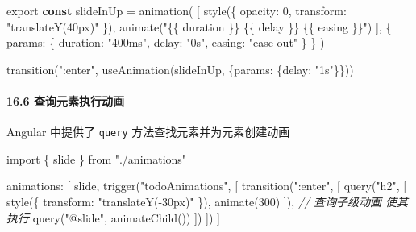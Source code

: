 \documentclass[
]{article}
\newenvironment{Shaded}{}{}
\newcommand{\CommentTok}[1]{\textcolor[rgb]{0.38,0.63,0.69}{\textit{#1}}}
\newcommand{\DataTypeTok}[1]{\textcolor[rgb]{0.56,0.13,0.00}{#1}}
\newcommand{\DecValTok}[1]{\textcolor[rgb]{0.25,0.63,0.44}{#1}}
\newcommand{\FunctionTok}[1]{\textcolor[rgb]{0.02,0.16,0.49}{#1}}
\newcommand{\ImportTok}[1]{#1}
\newcommand{\KeywordTok}[1]{\textcolor[rgb]{0.00,0.44,0.13}{\textbf{#1}}}
\newcommand{\NormalTok}[1]{#1}
\newcommand{\OperatorTok}[1]{\textcolor[rgb]{0.40,0.40,0.40}{#1}}
\newcommand{\StringTok}[1]{\textcolor[rgb]{0.25,0.44,0.63}{#1}}
\begin{document}
\begin{enumerate}
\begin{Shaded}
\begin{Highlighting}[]
\ImportTok{export} \KeywordTok{const}\NormalTok{ slideInUp }\OperatorTok{=} \FunctionTok{animation}\NormalTok{(}
\NormalTok{  [}
    \FunctionTok{style}\NormalTok{(\{ }\DataTypeTok{opacity}\OperatorTok{:} \DecValTok{0}\OperatorTok{,} \DataTypeTok{transform}\OperatorTok{:} \StringTok{"translateY(40px)"}\NormalTok{ \})}\OperatorTok{,}
    \FunctionTok{animate}\NormalTok{(}\StringTok{"\{\{ duration \}\} \{\{ delay \}\} \{\{ easing \}\}"}\NormalTok{)}
\NormalTok{  ]}\OperatorTok{,}
\NormalTok{  \{}
    \DataTypeTok{params}\OperatorTok{:}\NormalTok{ \{}
      \DataTypeTok{duration}\OperatorTok{:} \StringTok{"400ms"}\OperatorTok{,}
      \DataTypeTok{delay}\OperatorTok{:} \StringTok{"0s"}\OperatorTok{,}
      \DataTypeTok{easing}\OperatorTok{:} \StringTok{"ease{-}out"}
\NormalTok{    \}}
\NormalTok{  \}}
\NormalTok{)}
\end{Highlighting}
\end{Shaded}

\begin{Shaded}
\begin{Highlighting}[]
\FunctionTok{transition}\NormalTok{(}\StringTok{":enter"}\OperatorTok{,} \FunctionTok{useAnimation}\NormalTok{(slideInUp}\OperatorTok{,}\NormalTok{ \{}\DataTypeTok{params}\OperatorTok{:}\NormalTok{ \{}\DataTypeTok{delay}\OperatorTok{:} \StringTok{"1s"}\NormalTok{\}\}))}
\end{Highlighting}
\end{Shaded}
\end{enumerate}

\hypertarget{166-ux67e5ux8be2ux5143ux7d20ux6267ux884cux52a8ux753b}{%
\paragraph{16.6
查询元素执行动画}\label{166-ux67e5ux8be2ux5143ux7d20ux6267ux884cux52a8ux753b}}

Angular 中提供了 \texttt{query} 方法查找元素并为元素创建动画

\begin{Shaded}
\begin{Highlighting}[]
\ImportTok{import}\NormalTok{ \{ slide \} }\ImportTok{from} \StringTok{"./animations"}

\NormalTok{animations}\OperatorTok{:}\NormalTok{ [}
\NormalTok{  slide}\OperatorTok{,}
  \FunctionTok{trigger}\NormalTok{(}\StringTok{"todoAnimations"}\OperatorTok{,}\NormalTok{ [}
    \FunctionTok{transition}\NormalTok{(}\StringTok{":enter"}\OperatorTok{,}\NormalTok{ [}
      \FunctionTok{query}\NormalTok{(}\StringTok{"h2"}\OperatorTok{,}\NormalTok{ [}
        \FunctionTok{style}\NormalTok{(\{ }\DataTypeTok{transform}\OperatorTok{:} \StringTok{"translateY({-}30px)"}\NormalTok{ \})}\OperatorTok{,}
        \FunctionTok{animate}\NormalTok{(}\DecValTok{300}\NormalTok{)}
\NormalTok{      ])}\OperatorTok{,}
      \CommentTok{// 查询子级动画 使其执行}
      \FunctionTok{query}\NormalTok{(}\StringTok{"@slide"}\OperatorTok{,} \FunctionTok{animateChild}\NormalTok{())}
\NormalTok{    ])}
\NormalTok{  ])}
\NormalTok{]}
\end{Highlighting}
\end{Shaded}
\end{document}
